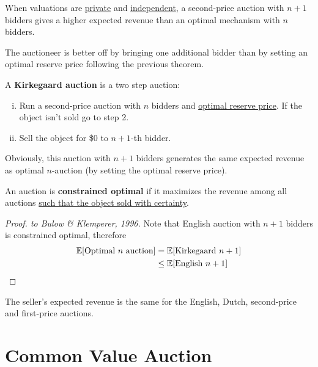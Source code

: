 \documentclass{article}
\begin{document}
	\begin{theorem}
		When valuations are \ul{private} and \ul{independent}, a second-price auction with $n+1$ bidders gives a higher expected revenue than an optimal mechanism with $n$ bidders.
	\end{theorem}
	
	\begin{remark}
		The auctioneer is better off by bringing one additional bidder than by setting an optimal reserve price following the previous theorem.
	\end{remark}
	
	\begin{definition}
		A \textbf{Kirkegaard auction} is a two step auction:
		\begin{enumerate}[(i)]
			\item Run a second-price auction with $n$ bidders and \ul{optimal reserve price}. If the object isn't sold go to step 2.
			\item Sell the object for \$0 to $n+1$-th bidder.
		\end{enumerate}
		Obviously, this auction with $n+1$ bidders generates the same expected revenue as optimal $n$-auction (by setting the optimal reserve price).
	\end{definition}

	\begin{definition}
		An auction is \textbf{constrained optimal} if it maximizes the revenue among all auctions \ul{such that the object sold with certainty}.
	\end{definition}
	
	\begin{proof}[Proof. to Bulow \& Klemperer, 1996]
		Note that English auction with $n+1$ bidders is constrained optimal, therefore
		\begin{align}
			\mathbb{E}[{\text{{Optimal $n$ auction}}}] &= \mathbb{E}[{\text{{Kirkegaard  $n+1$}}}] \\
			&\leq \mathbb{E}[{\text{{English  $n+1$}}}]
		\end{align}
	\end{proof}
	
	\begin{corollary}
		The seller's expected revenue is the same for the English, Dutch, second-price and first-price auctions.
	\end{corollary}
	
	\section{Common Value Auction}
	
\end{document}
